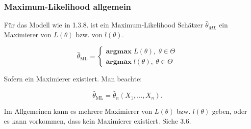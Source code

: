 \documentclass[10pt]{article}
\newcommand{\FZV}{X_1, \ldots, X_n} %
\begin{document}
	
	\subsubsection{Maximum-Likelihood allgemein}
	
	Für das Modell wie in 1.3.8. ist ein Maximum-Likelihood Schätzer $\hat{\theta}_{ML}$ ein Maximierer von $L(\theta)$ bzw. von $l(\theta)$. 
	
	\begin{equation*}
		\hat{\theta}_\text{ML} =
		\begin{cases}
			\textbf{argmax} \; L(\theta),\; \theta \in \Theta\\
			\textbf{argmax} \; l(\theta),\; \theta \in \Theta
		\end{cases}
	\end{equation*}
	
	Sofern ein Maximierer existiert. 
	Man beachte: 
	
	\begin{equation*}
		\hat{\theta}_\text{ML} = \hat{\theta}_n (\FZV).
	\end{equation*}
	
	Im Allgemeinen kann es mehrere Maximierer von $L(\theta)$ bzw. $l(\theta)$ geben, oder es kann vorkommen, dass kein Maximierer existiert. Siehe 3.6. 
	
\end{document}

